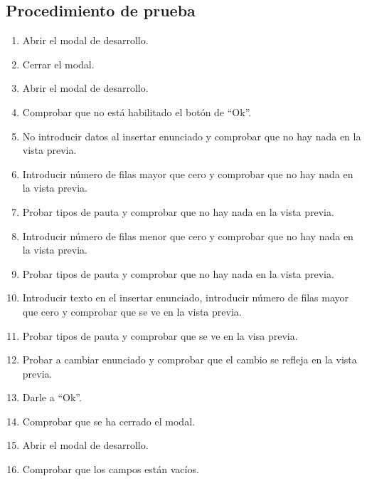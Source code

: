 \subsection{Procedimiento de prueba}
\label{procedimientoPruebas:desarrollo}
\begin{enumerate}
    \item Abrir el modal de desarrollo.
    \item Cerrar el modal.
    \item Abrir el modal de desarrollo.
    \item Comprobar que no está habilitado el botón de ``Ok''.
    \item No introducir datos al insertar enunciado y comprobar que no hay nada en la vista previa.
    \item Introducir número de filas mayor que cero y comprobar que no hay nada en la vista previa.
    \item Probar tipos de pauta y comprobar que no hay nada en la vista previa.
    \item Introducir número de filas menor que cero y comprobar que no hay nada en la vista previa.
    \item Probar tipos de pauta y comprobar que no hay nada en la vista previa.
    \item Introducir texto en el insertar enunciado, introducir número de filas mayor que cero y comprobar que se ve en la vista previa.
    \item Probar tipos de pauta y comprobar que se ve en la visa previa.
    \item Probar a cambiar enunciado y comprobar que el cambio se refleja en la vista previa.
    \item Darle a ``Ok''.
    \item Comprobar que se ha cerrado el modal.
    \item Abrir el modal de desarrollo.
    \item Comprobar que los campos están vacíos.
\end{enumerate}

